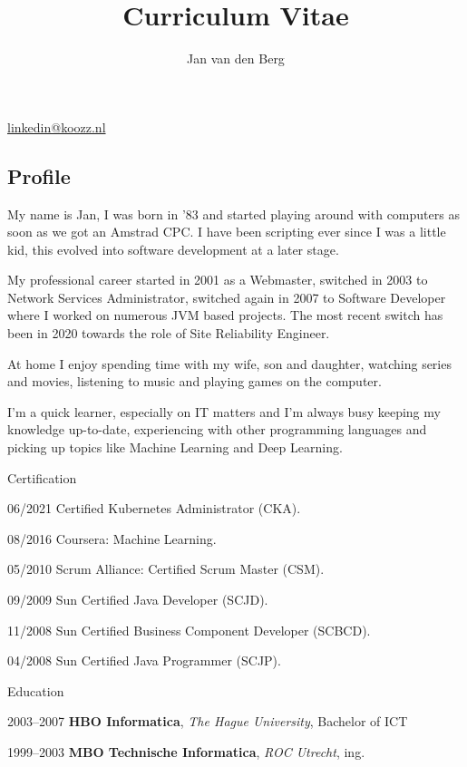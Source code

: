 \documentclass[11pt,a4paper]{article}
\title{Curriculum Vitae}
\author{Jan van den Berg}
\makeatletter
\renewcommand{\maketitle}{
	\begin{center}
	{\huge\bfseries\theauthor}

	\vspace{.25em}
	\href{mailto:linkedin@koozz.nl}{linkedin@koozz.nl}
	\end{center}
}
\makeatother
\begin{document}
\maketitle
\begin{cv}{}
	\section{Profile}
	My name is Jan, I was born in '83 and started playing around with computers
	as soon as we got an Amstrad CPC. I have been scripting ever since I was a
	little kid, this evolved into software development at a later stage.

	My professional career started in 2001 as a Webmaster, switched in 2003 to
	Network Services Administrator, switched again in 2007 to Software Developer
	where I worked on numerous JVM based projects. The most recent switch has
	been in 2020 towards the role of Site Reliability Engineer.

	At home I enjoy spending time with my wife, son and daughter, watching series
	and movies, listening to music and playing games on the computer.

	I'm a	quick learner, especially on IT matters and I'm always busy keeping my
	knowledge up-to-date, experiencing with other programming languages and
	picking up topics like Machine Learning and Deep Learning.

	\vspace{.5em}

	\begin{cvlist}{Certification}
		\item[06/2021] Certified Kubernetes Administrator (CKA).
		\item[08/2016] Coursera: Machine Learning.
		\item[05/2010] Scrum Alliance: Certified Scrum Master (CSM).
		\item[09/2009] Sun Certified Java Developer (SCJD).
		\item[11/2008] Sun Certified Business Component Developer (SCBCD).
		\item[04/2008] Sun Certified Java Programmer (SCJP).
	\end{cvlist}

	\vspace{.5em}

	\begin{cvlist}{Education}
		\item[2003--2007] \textbf{HBO Informatica}, \textit{The Hague University},
		Bachelor of ICT
		\item[1999--2003] \textbf{MBO Technische Informatica}, \textit{ROC
		Utrecht}, ing.
	\end{cvlist}


\end{cv}
\end{document}
